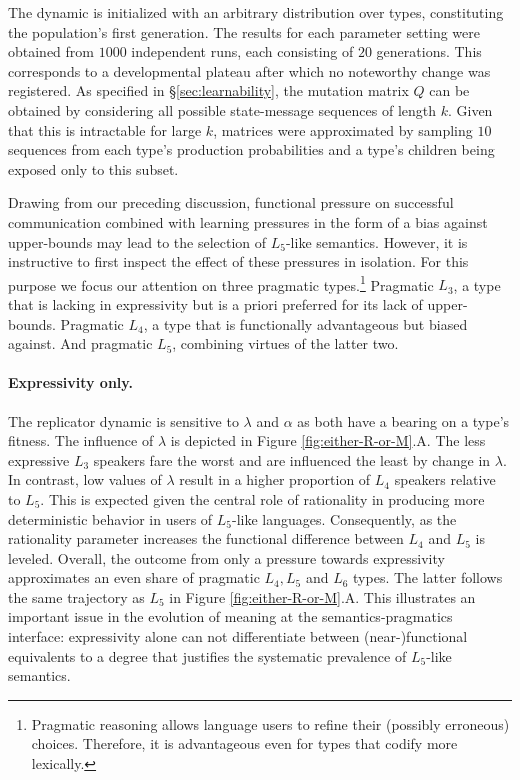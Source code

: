 \documentclass[a4paper]{article}
\begin{document}
The dynamic is initialized with an arbitrary distribution over types, constituting the population's first generation. The results for each parameter setting were obtained from $1000$ independent runs, each consisting of $20$ generations. This corresponds to a developmental plateau after which no noteworthy change was registered. As specified in \S\ref{sec:learnability}, the mutation matrix $Q$ can be obtained by considering all possible state-message sequences of length $k$. Given that this is intractable for large $k$, matrices were approximated by sampling $10$ sequences from each type's production probabilities and a type's children being exposed only to this subset. 

Drawing from our preceding discussion, functional pressure on successful communication combined with learning pressures in the form of a bias against upper-bounds may lead to the selection of $L_5$-like semantics. However, it is instructive to first inspect the effect of these pressures in isolation. For this purpose we focus our attention on three pragmatic types.\footnote{Pragmatic reasoning allows language users to refine their (possibly erroneous) choices. Therefore, it is advantageous even for types that codify more lexically.} Pragmatic $L_3$, a type that is lacking in expressivity but is a priori preferred for its lack of upper-bounds. Pragmatic $L_4$, a type that is functionally advantageous but biased against. And pragmatic $L_5$, combining virtues of the latter two.  

\paragraph{Expressivity only.} The replicator dynamic is sensitive to $\lambda$ and $\alpha$ as both have a bearing on a type's fitness. The influence of $\lambda$ is depicted in Figure \ref{fig:either-R-or-M}.A. The less expressive $L_3$ speakers fare the worst and are influenced the least by change in $\lambda$. In contrast, low values of $\lambda$ result in a higher proportion of $L_4$ speakers relative to $L_5$. This is expected given the central role of rationality in producing more deterministic behavior in users of $L_5$-like languages. Consequently, as the rationality parameter increases the functional difference between $L_4$ and $L_5$ is leveled. Overall, the outcome from only a pressure towards expressivity approximates an even share of pragmatic $L_4, L_5$ and $L_6$ types. The latter follows the same trajectory as $L_5$ in Figure \ref{fig:either-R-or-M}.A.  This illustrates an important issue in the evolution of meaning at the semantics-pragmatics interface: expressivity alone can not differentiate between (near-)functional equivalents to a degree that justifies the systematic prevalence of $L_5$-like semantics.  
\end{document}
